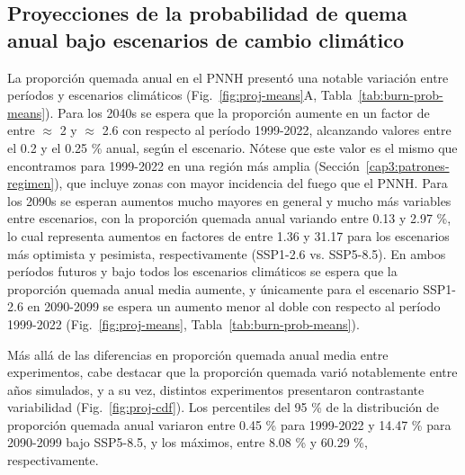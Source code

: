 \begin{figure}[p]
\end{figure}

\FloatBarrier %

\subsection{Proyecciones de la probabilidad de quema anual bajo escenarios de cambio climático}

La proporción quemada anual en el PNNH presentó una notable variación entre períodos y escenarios climáticos (Fig.~\ref{fig:proj-means}A, Tabla~\ref{tab:burn-prob-means}). Para los 2040s se espera que la proporción aumente en un factor de entre $\approx$ 2 y $\approx$ 2.6 con respecto al período 1999-2022, alcanzando valores entre el 0.2 y el 0.25 \% anual, según el escenario. Nótese que este valor es el mismo que encontramos para 1999-2022 en una región más amplia (Sección~\ref{cap3:patrones-regimen}), que incluye zonas con mayor incidencia del fuego que el PNNH. Para los 2090s se esperan aumentos mucho mayores en general y mucho más variables entre escenarios, con la proporción quemada anual variando entre 0.13 y 2.97 \%, lo cual representa aumentos en factores de entre 1.36 y 31.17 para los escenarios más optimista y pesimista, respectivamente (SSP1-2.6 vs. SSP5-8.5). En ambos períodos futuros y bajo todos los escenarios climáticos se espera que la proporción quemada anual media aumente, y únicamente para el escenario SSP1-2.6 en 2090-2099 se espera un aumento menor al doble con respecto al período 1999-2022 (Fig.~\ref{fig:proj-means}, Tabla~\ref{tab:burn-prob-means}). 

Más allá de las diferencias en proporción quemada anual media entre experimentos, cabe destacar que la proporción quemada varió notablemente entre años simulados, y a su vez, distintos experimentos presentaron contrastante variabilidad (Fig.~\ref{fig:proj-cdf}). Los percentiles del 95 \% de la distribución de proporción quemada anual variaron entre 0.45 \% para 1999-2022 y 14.47 \% para 2090-2099 bajo SSP5-8.5, y los máximos, entre 8.08 \% y 60.29 \%, respectivamente. 

